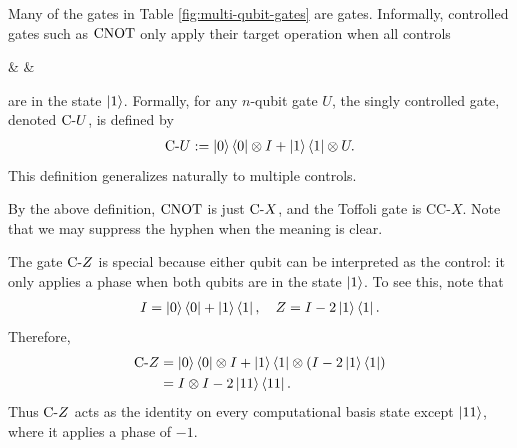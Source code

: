 \begin{definition}
Many of the gates in Table \ref{fig:multi-qubit-gates} are  gates. Informally, controlled gates such as $\text{CNOT}$ only apply their target operation when all controls
\begin{ZX}\rar & \zxCtrl{} \rar &\end{ZX}
are in the state $\ket{1}$. Formally, for any $n$-qubit gate $U$, the singly controlled gate, denoted $\text{C-} U$, is defined by
\begin{align}
    \text{C-} U := \ket0 \bra0 \otimes I + \ket1 \bra1 \otimes U.
\end{align}
This definition generalizes naturally to multiple controls. 
\end{definition}

By the above definition, $\text{CNOT}$ is just $\text{C-} X$, and the Toffoli gate is $\text{CC-}X$. Note that we may suppress the hyphen when the meaning is clear.

The gate $\text{C-} Z$ is special because either qubit can be interpreted as the control: it only applies a phase when both qubits are in the state $\ket{1}$. To see this, note that
\begin{align}
    I = \ket0 \bra0 + \ket1 \bra1, \quad
    Z = I - 2\ket1\bra1.
\end{align}
Therefore,
\begin{align}
    \text{C-} Z 
    &= \ket0 \bra0 \otimes I + \ket1 \bra1 \otimes (I - 2 \ket1 \bra1) \\
    &= I \otimes I - 2 \ket{11} \bra{11}.
\end{align}
Thus $\text{C-} Z$ acts as the identity on every computational basis state except $\ket{11}$, where it applies a phase of $-1$.


